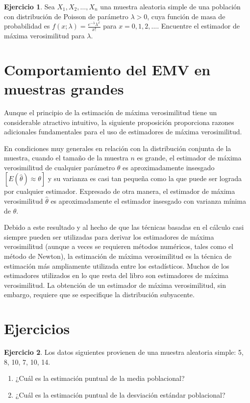 \documentclass[
  11pt,
]{book}
\theoremstyle{definition}
\theoremstyle{definition}
\theoremstyle{definition}
\newtheorem{exercise}{Ejercicio}[chapter]
\theoremstyle{definition}
\theoremstyle{remark}
\begin{document}
\begin{exercise}
Sea \(X_1, X_2, \dots, X_n\) una muestra aleatoria simple de una población con distribución de Poisson de parámetro \(\lambda > 0\), cuya función de masa de probabilidad es \(f(x; \lambda) = \frac{e^{-\lambda} \lambda^x}{x!}\) para \(x = 0, 1, 2, \dots\). Encuentre el estimador de máxima verosimilitud para \(\lambda\).
\end{exercise}

\section{Comportamiento del EMV en muestras grandes}\label{comportamiento-del-emv-en-muestras-grandes}

Aunque el principio de la estimación de máxima verosimilitud tiene un considerable atractivo intuitivo, la siguiente proposición proporciona razones adicionales fundamentales para el uso de estimadores de máxima verosimilitud.

En condiciones muy generales en relación con la distribución conjunta de la muestra, cuando el tamaño de la muestra \(n\) es grande, el estimador de máxima verosimilitud de cualquier parámetro \(\theta\) es aproximadamente insesgado \([E(\hat{\theta}) \approx \theta]\) y su varianza es casi tan pequeña como la que puede ser lograda por cualquier estimador. Expresado de otra manera, el estimador de máxima verosimilitud \(\hat{\theta}\) es aproximadamente el estimador insesgado con varianza mínima de \(\theta\).

Debido a este resultado y al hecho de que las técnicas basadas en el cálculo casi siempre pueden ser utilizadas para derivar los estimadores de máxima verosimilitud (aunque a veces se requieren métodos numéricos, tales como el método de Newton), la estimación de máxima verosimilitud es la técnica de estimación más ampliamente utilizada entre los estadísticos. Muchos de los estimadores utilizados en lo que resta del libro son estimadores de máxima verosimilitud. La obtención de un estimador de máxima verosimilitud, sin embargo, requiere que se especifique la distribución subyacente.

\section{Ejercicios}\label{ejercicios}

\begin{exercise}

Los datos siguientes provienen de una muestra aleatoria simple: 5, 8, 10, 7, 10, 14.

\begin{enumerate}
\def\labelenumi{\alph{enumi}.}
\item
  ¿Cuál es la estimación puntual de la media poblacional?
\item
  ¿Cuál es la estimación puntual de la desviación estándar poblacional?
\end{enumerate}

\end{exercise}
\end{document}
